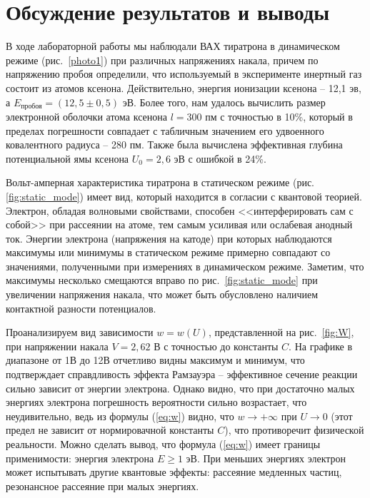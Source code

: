 \documentclass[a4paper,12pt]{article} %
\begin{document}
\newpage
\section{Обсуждение результатов и выводы}
	В ходе лабораторной работы мы наблюдали ВАХ тиратрона в динамическом режиме (рис.~\ref{photo1}) при различных напряжениях накала, причем по напряжению пробоя определили, что используемый в эксперименте инертный газ состоит из атомов ксенона. Действительно, энергия ионизации ксенона -- 12,1 эв, а $E_\text{пробоя} = (12,5 \pm 0,5)$ эВ. Более того, нам удалось вычислить размер электронной оболочки атома ксенона $l = 300$ пм с точностью в 10\%, который в пределах погрешности совпадает с табличным значением его удвоенного ковалентного радиуса -- 280 пм. Также была вычислена эффективная глубина потенциальной ямы ксенона $U_0 = 2,6$ эВ с ошибкой в 24\%.
	
	Вольт-амперная характеристика тиратрона в статическом режиме (рис.\ref{fig:static_mode}) имеет вид, который находится в согласии с квантовой теорией. Электрон, обладая волновыми свойствами, способен <<интерферировать сам с собой>> при рассеянии на атоме, тем самым усиливая или ослабевая анодный ток. Энергии электрона (напряжения на катоде) при которых наблюдаются максимумы или минимумы в статическом режиме примерно совпадают со значениями, полученными при измерениях в динамическом режиме. Заметим, что максимумы несколько смещаются вправо по рис.~\ref{fig:static_mode} при увеличении напряжения накала, что может быть обусловлено наличием контактной разности потенциалов.
	
	Проанализируем вид зависимости $w = w(U)$, представленной на рис.~\ref{fig:W}, при напряжении накала $V = 2,62$ В с точностью до константы $C$. На графике в диапазоне от 1В до 12В отчетливо видны максимум и минимум, что подтверждает справдливость эффекта Рамзауэра -- эффективное сечение реакции сильно зависит от энергии электрона. Однако видно, что при достаточно малых энергиях электрона погрешность вероятности сильно возрастает, что неудивительно, ведь из формулы (\ref{eq:w}) видно, что $w\rightarrow +\infty$ при $U\rightarrow0$ (этот предел не зависит от нормировачной константы $C$), что противоречит физической реальности. Можно сделать вывод, что формула (\ref{eq:w}) имеет границы применимости: энергия электрона $E \geq 1$ эВ. При меньших энергиях электрон может испытывать другие квантовые эффекты: рассеяние медленных частиц, резонансное рассеяние при малых энергиях.

\newpage
\end{document}
